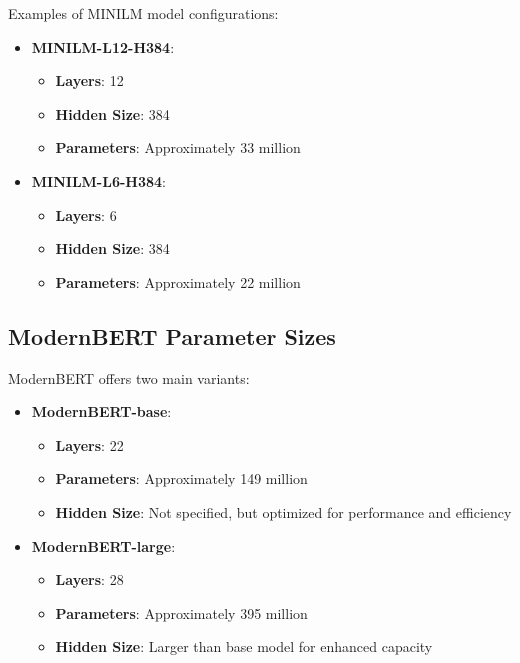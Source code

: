 \documentclass{article}
\begin{document}
Examples of MINILM model configurations:  
  
\begin{itemize}  
    \item \textbf{MINILM-L12-H384}:  
    \begin{itemize}  
        \item \textbf{Layers}: 12  
        \item \textbf{Hidden Size}: 384  
        \item \textbf{Parameters}: Approximately 33 million  
    \end{itemize}  
    \item \textbf{MINILM-L6-H384}:  
    \begin{itemize}  
        \item \textbf{Layers}: 6  
        \item \textbf{Hidden Size}: 384  
        \item \textbf{Parameters}: Approximately 22 million  
    \end{itemize}  
\end{itemize}  
  
\subsection{ModernBERT Parameter Sizes}  
  
ModernBERT offers two main variants:  
  
\begin{itemize}  
    \item \textbf{ModernBERT-base}:  
    \begin{itemize}  
        \item \textbf{Layers}: 22  
        \item \textbf{Parameters}: Approximately 149 million  
        \item \textbf{Hidden Size}: Not specified, but optimized for performance and efficiency  
    \end{itemize}  
    \item \textbf{ModernBERT-large}:  
    \begin{itemize}  
        \item \textbf{Layers}: 28  
        \item \textbf{Parameters}: Approximately 395 million  
        \item \textbf{Hidden Size}: Larger than base model for enhanced capacity  
    \end{itemize}  
\end{itemize}  
  
\end{document}
